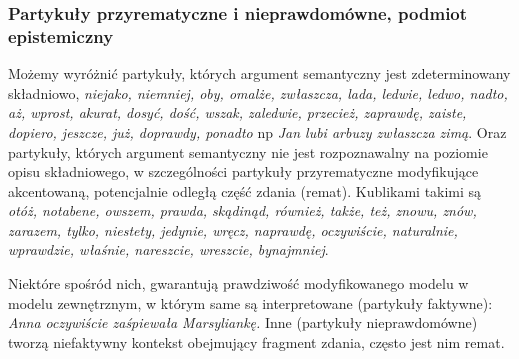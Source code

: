 \documentclass[12pt]{mwart}
\theoremstyle{remark}
\begin{document}

\subsubsection{Partykuły przyrematyczne i nieprawdomówne, podmiot epistemiczny}
Możemy wyróżnić partykuły, których argument semantyczny jest zdeterminowany składniowo,
{\it niejako, niemniej, oby, omalże, zwłaszcza, lada, ledwie, ledwo, nadto,
aż, wprost, akurat, dosyć, dość, wszak, zaledwie, przecież, zaprawdę, zaiste,
dopiero, jeszcze, już, doprawdy, ponadto} 
np {\it Jan lubi arbuzy zwłaszcza zimą}.
Oraz partykuły, których argument semantyczny nie jest rozpoznawalny na poziomie 
opisu składniowego, w szczególności partykuły przyrematyczne 
modyfikujące akcentowaną, potencjalnie odległą część zdania (remat).%
Kublikami takimi są {\it otóż, notabene, owszem, prawda, skądinąd,
również, także, też, znowu, znów, zarazem, tylko, niestety, jedynie, wręcz,
naprawdę, oczywiście, naturalnie, wprawdzie, właśnie, nareszcie, wreszcie,
bynajmniej}. 

Niektóre spośród nich, gwarantują prawdziwość modyfikowanego 
modelu w modelu zewnętrznym, w którym same są interpretowane
(partykuły faktywne): %
{\it Anna oczywiście zaśpiewała Marsyliankę.}
Inne (partykuły nieprawdomówne) tworzą niefaktywny kontekst obejmujący fragment zdania,
często jest nim remat.
\end{document}
